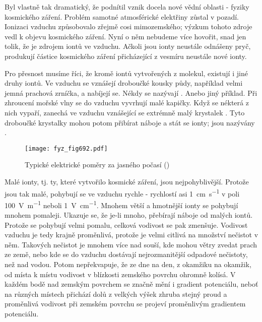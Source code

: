     Byl vlastně tak dramatický, že podnítil vznik docela nové vědní oblasti - fyziky kosmického
    záření. Problém samotné atmosférické elektřiny zůstal v pozadí. Ionizaci vzduchu způsobovalo
    zřejmě cosi mimozemského; výzkum tohoto zdroje vedl k objevu kosmického záření. Nyní o něm
    nebudeme více hovořit, snad jen tolik, že je zdrojem iontů ve vzduchu. Ačkoli jsou ionty
    neustále odnášeny pryč, produkují částice kosmického záření přicházející z vesmíru neustále nové
    ionty.

    Pro přesnost musíme říci, že kromě iontů vytvořených z molekul, existují i jiné druhy iontů. Ve
    vzduchu se vznášejí droboučké kousky půdy, například velmi jemná prachová zrníčka, a nabíjejí
    se. Nékdy se nazývají . Anebo jiný příklad. Při zhroucení mořské vlny se do vzduchu
    vyvrhují malé kapičky. Když se nékterá z nich vypaří, zanechá ve vzduchu vznášející se extrémně
    malý krystalek . Tyto droboučké krystalky mohou potom přibírat náboje a stát se ionty;
    jsou nazývány .

    \begin{figure}[ht!] %
      \centering
      \texttt{[image: fyz\_fig692.pdf]}
      \caption{Typické elektrické poměry za jasného počasí
               (\cite[s.~707]{Feynman02})}
      \label{fyz:fig692}
    \end{figure}

    Malé ionty, tj. ty, které vytvořilo kosmické záření, jsou nejpohyblivější. Protože jsou tak
    malé, pohybují se ve vzduchu rychle - rychlostí asi \SI{1}{\cm\per\s} v poli \SI{100}{\V\per\m}
    neboli \SI{1}{\V\per\cm}. Mnohem větší a hmotnější ionty se pohybují mnohem pomaleji. Ukazuje
    se, že je-li  mnoho, přebírají náboje od malých iontů. Protože  se
    pohybují velmi pomalu, celková vodivost se pak zmenšuje. Vodivost vzduchu je tedy krajně
    proměnlivá, protože je velmi citlivá na množství nečistot v něm. Takových nečistot je mnohem
    více nad souší, kde mohou větry zvedat prach ze země, nebo kde se do vzduchu dostávají
    nejrozmanitější odpadové nečistoty, než nad vodou. Potom nepřekvapuje, že ze dne na den, z
    okamžiku na okamžik, od místa k místu vodivost v blízkosti zemského povrchu ohromně kolísá. V
    každém bodě nad zemským povrchem se značně mění i gradient potenciálu, neboť na různých místech
    přichází dolů z velkých výšek zhruba stejný proud a proměnlivá vodivost při zemském povrchu se
    projeví proměnlivým gradientem potenciálu.

